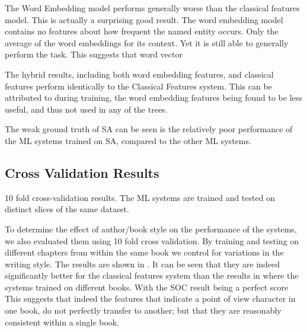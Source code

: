 \documentclass[11pt,a4paper]{article}
\begin{document}
The Word Embedding model performs generally worse than the classical features model.
This is actually a surprising good result.
The word embedding model contains no features about how frequent the named entity occurs.
Only the average of the word embeddings for its context.
Yet it is still able to generally perform the task.
This suggests that word vector 

The hybrid results, including both word embedding features, and classical features perform identically to the Classical Features system.
This can be attributed to during training, the word embedding features being found to be less useful, and thus not used in any of the trees.

The weak ground truth of SA can be seen is the relatively poor performance of the ML systems trained on SA, compared to the other ML systems.



\subsection{Cross Validation Results}

\begin{table*}
	\begin{adjustbox}{max width=\textwidth}
	\end{adjustbox}
	
	\caption{10 fold cross-validation results. The ML systems are trained and tested on distinct slices of the same dataset. \label{tbl:rescross}}
\end{table*}

To determine the effect of author/book style on the performance of the systems,
we also evaluated them using 10 fold cross validation.
By training and testing on different chapters from within the same book we control for variations in the writing style.
The results are shown in  .
It can be seen that they are indeed significantly better for the classical features system than the results in  where the systems trained on different books.
With the SOC result being a perfect score
This suggests that indeed the features that indicate a point of view character in one book, do not perfectly transfer to another; but that they are reasonably consistent within a single book.
\end{document}
